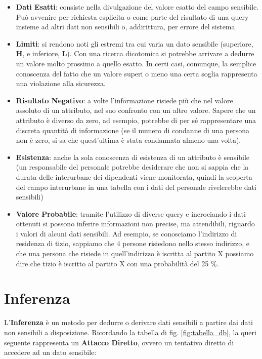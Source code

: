 \begin{itemize}
	\item\textbf{Dati Esatti}: consiste nella divulgazione del valore esatto del campo sensibile. Può avvenire per richiesta esplicita o come parte del risultato di una query insieme ad altri dati non sensibili o, addirittura, per errore del sistema
	\item \textbf{Limiti}: si rendono noti gli estremi tra cui varia un dato sensibile (superiore, \textbf{H}, e inferiore, \textbf{L}). Con una ricerca dicotomica si potrebbe arrivare a dedurre un valore molto prossimo a quello esatto. In certi casi, comunque, la semplice conoscenza del fatto che un valore superi o meno una certa soglia rappresenta una violazione alla sicurezza.
	\item \textbf{Risultato Negativo}: a volte l'informazione risiede più che nel valore assoluto di un attributo, nel suo confronto con un altro valore. Sapere che un attributo è diverso da zero, ad esempio, potrebbe di per sé rappresentare una discreta quantità di informazione (se il numero di condanne di una persona non è zero, si sa che quest'ultima è stata condannata almeno una volta).
	\item \textbf{Esistenza}: anche la sola conoscenza di esistenza di un attributo è sensibile (un responsabile del personale potrebbe desiderare che non si sappia che la durata delle interurbane dei dipendenti viene monitorata, quindi la scoperta del campo interurbane in una tabella con i dati del personale rivelerebbe dati sensibili)
	\item \textbf{Valore Probabile}: tramite l'utilizzo di diverse query e incrociando i dati ottenuti si possono inferire informazioni non precise, ma attendibili, riguardo i valori di alcuni dati sensibili. Ad esempio, se conosciamo l'indirizzo di residenza di tizio, sappiamo che 4 persone risiedono nello stesso indirizzo, e che una persona che risiede in quell'indirizzo è iscritta al partito X possiamo dire che tizio è iscritto al partito X con una probabilità del 25 $\%$.
\end{itemize}

\section{Inferenza}
L'\textbf{Inferenza} è un metodo per dedurre o derivare dati sensibili a partire dai dati non sensibili a disposizione. Ricordando la tabella di fig. \ref{fig:tabella_db}, la queri seguente rappresenta un \textbf{Attacco Diretto}, ovvero un tentativo diretto di accedere ad un dato sensibile:

